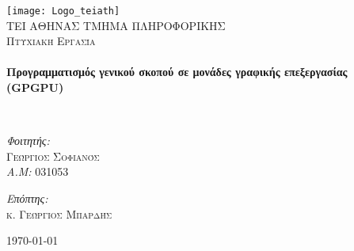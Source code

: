 \begin{titlepage}
\begin{center}

\texttt{[image: Logo\_teiath]}~\\[1cm]

\textsc{\LARGE ΤΕΙ ΑΘΗΝΑΣ ΤΜΗΜΑ ΠΛΗΡΟΦΟΡΙΚΗΣ}\\[1.5cm]

\textsc{\Large Πτυχιακή Εργασία}\\[0.5cm]

\HRule \\[0.4cm]
{ \huge \bfseries Προγραμματισμός γενικού σκοπού σε μονάδες γραφικής επεξεργασίας (GPGPU) \\[0.4cm] }

\HRule \\[1.5cm]

\begin{minipage}{0.4\textwidth}
\begin{flushleft} \large
\emph{Φοιτητής:}\\
\textsc{Γεώργιος Σοφιανός}\\
\emph{A.M:} 031053
\end{flushleft}
\end{minipage}
\begin{minipage}{0.4\textwidth}
\begin{flushright} \large
\emph{Επόπτης:} \\
\textsc{κ. Γεώργιος Μπαρδής}
\end{flushright}
\end{minipage}

\vfill

{\large \today}

\end{center}
\end{titlepage}
